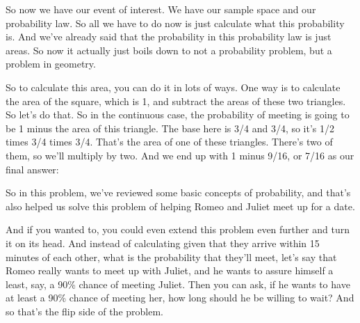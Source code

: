 \documentclass[pdftex, brazil, 12pt, twoside]{article}
\begin{document}
So now we have our event of interest.
We have our sample space and our probability law.
So all we have to do now is just calculate what this
probability is.
And we've already said that the probability in this
probability law is just areas.
So now it actually just boils down to not a probability
problem, but a problem in geometry.

So to calculate this area, you can do it in lots of ways.
One way is to calculate the area of the square, which is
1, and subtract the areas of these two triangles.
So let's do that.
So in the continuous case, the probability of meeting is
going to be 1 minus the area of this triangle.
The base here is 3/4 and 3/4, so it's 1/2
times 3/4 times 3/4.
That's the area of one of these triangles.
There's two of them, so we'll multiply by two.
And we end up with 1 minus 9/16, or 7/16
as our final answer:

\begin{figure}[H]
  \begin{center}
  \end{center}
\end{figure}

So in this problem, we've reviewed some basic concepts
of probability, and that's also helped us solve this
problem of helping Romeo and Juliet meet up for a date.

And if you wanted to, you could even extend this problem
even further and turn it on its head.
And instead of calculating given that they arrive within
15 minutes of each other, what is the probability that
they'll meet, let's say that Romeo really wants to meet up
with Juliet, and he wants to assure himself a least, say, a
90\% chance of meeting Juliet.
Then you can ask, if he wants to have at least a 90\% chance
of meeting her, how long should he be willing to wait?
And so that's the flip side of the problem.
\end{document}
